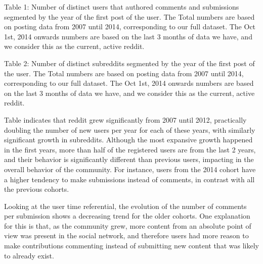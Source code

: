 Table 1: Number of distinct users that authored comments and submissions segmented by the year of the first post of the user. The Total numbers are based on posting data from 2007 until 2014, corresponding to our full dataset. The Oct 1st, 2014 onwards numbers are based on the last 3 months of data we have, and we consider this as the current, active reddit.


Table 2: Number of distinct subreddits segmented by the year of the first post of the user. The Total numbers are based on posting data from 2007 until 2014, corresponding to our full dataset. The Oct 1st, 2014 onwards numbers are based on the last 3 months of data we have, and we consider this as the current, active reddit.

Table indicates that reddit grew significantly from 2007 until 2012, practically doubling the number of new users per year for each of these years, with similarly significant growth in subreddits. Although the most expansive growth happened in the first years, more than half of the registered users are from the last 2 years, and their behavior is significantly different than previous users, impacting in the overall behavior of the community. For instance, users from the 2014 cohort have a higher tendency to make submissions instead of comments, in contrast with all the previous cohorts.

Looking at the user time referential, the evolution of the number of comments per submission shows a decreasing trend for the older cohorts. One explanation for this is that, as the community grew, more content from an absolute point of view was present in the social network, and therefore users had more reason to make contributions commenting instead of submitting new content that was likely to already exist.




